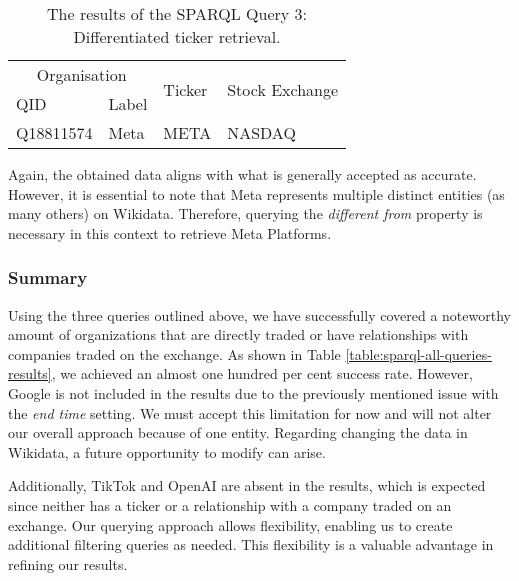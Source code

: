 {\begin{table}[ht]
    \centering
    \caption{The results of the SPARQL Query 3: Differentiated ticker retrieval.}
    \label{table:sparql_query_3_results}
    \begin{tabular}{l l l l}
    \hline
    \multicolumn{2}{c}{Organisation} & \multirow{2}{*}{Ticker} & \multirow{2}{*}{Stock Exchange}\\
    \cline{1-2}
    QID & Label \\
    \hline
    Q18811574 & Meta & META & NASDAQ \\ \hline
    \end{tabular}
\end{table}    

Again, the obtained data aligns with what is generally accepted as accurate. However, it is essential to note that Meta represents multiple distinct entities (as many others) on Wikidata. Therefore, querying the \textit{different from} property is necessary in this context to retrieve Meta Platforms.

\subsubsection*{Summary}
\label{subsubsec:sparql-wrapper-summary}
Using the three queries outlined above, we have successfully covered a noteworthy amount of organizations that are directly traded or have relationships with companies traded on the exchange. As shown in Table \ref{table:sparql-all-queries-results}, we achieved an almost one hundred per cent success rate. However, Google is not included in the results due to the previously mentioned issue with the \textit{end time} setting. We must accept this limitation for now and will not alter our overall approach because of one entity. Regarding changing the data in Wikidata, a future opportunity to modify can arise.

Additionally, TikTok and OpenAI are absent in the results, which is expected since neither has a ticker or a relationship with a company traded on an exchange. Our querying approach allows flexibility, enabling us to create additional filtering queries as needed. This flexibility is a valuable advantage in refining our results.

}
